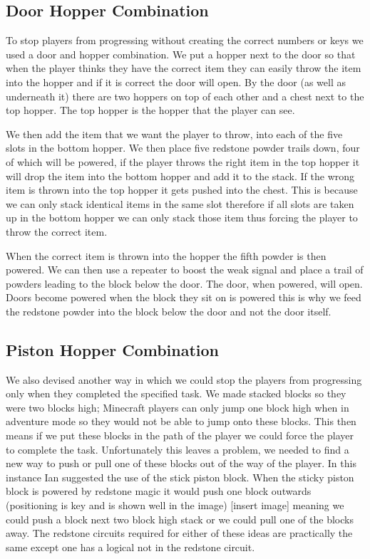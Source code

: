 \subsection{Door Hopper Combination}
To stop players from progressing without creating the correct numbers or keys we used a door and hopper combination. We put a hopper next to the door so that when the player thinks they have the correct item they can easily throw the item into the hopper and if it is correct the door will open. By the door (as well as underneath it) there are two hoppers on top of each other and a chest next to the top hopper. The top hopper is the hopper that the player can see.

We then add the item that we want the player to throw, into each of the five slots in the bottom hopper. We then place five redstone powder trails down, four of which will be powered, if the player throws the right item in the top hopper it will drop the item into the bottom hopper and add it to the stack. If the wrong item is thrown into the top hopper it gets pushed into the chest. This is because we can only stack identical items in the same slot therefore if all slots are taken up in the bottom hopper we can only stack those item thus forcing the player to throw the correct item.

When the correct item is thrown into the hopper the fifth powder is then powered. We can then use a repeater to boost the weak signal and place a trail of powders leading to the block below the door. The door, when powered, will open. Doors become powered when the block they sit on is powered this is why we feed the redstone powder into the block below the door and not the door itself.

\subsection{Piston Hopper Combination}
We also devised another way in which we could stop the players from progressing only when they completed the specified task. We made stacked blocks so they were two blocks high; Minecraft players can only jump one block high when in adventure mode so they would not be able to jump onto these blocks. This then means if we put these blocks in the path of the player we could force the player to complete the task. Unfortunately this leaves a problem, we needed to find a new way to push or pull one of these blocks out of the way of the player. In this instance Ian suggested the use of the stick piston block. When the sticky piston block is powered by redstone magic it would push one block outwards (positioning is key and is shown well in the image) [insert image] meaning we could push a block next two block high stack or we could pull one of the blocks away. The redstone circuits required for either of these ideas are practically the same except one has a logical not in the redstone circuit.

